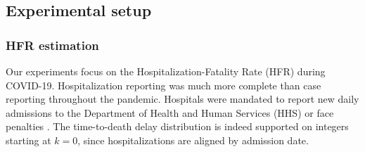 \documentclass{article}
\newcommand{\rjtcomment}[1]{{\color{purple}[RJT: #1]}}
\begin{document}



\subsection{Experimental setup}\label{sec:setup}
\subsubsection{HFR estimation}

Our experiments focus on the Hospitalization-Fatality Rate (HFR) during COVID-19. Hospitalization reporting was much more complete than case reporting throughout the pandemic. Hospitals were mandated to report new daily admissions to the Department of Health and Human Services (HHS) or face penalties \citep{HHS2023}. The time-to-death delay distribution is indeed supported on integers starting at $k=0$, since hospitalizations are aligned by admission date.
\end{document}
